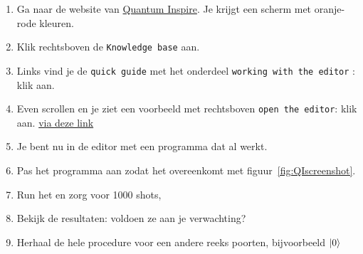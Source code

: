 \documentclass[../../main.tex]{subfiles}
\begin{document}
\begin{enumerate}
\item Ga naar de website van \href{https://www.quantum-inspire.com/}{Quantum Inspire}. Je krijgt een scherm met oranje-rode kleuren.
\item Klik rechtsboven de \texttt{Knowledge base} aan.
\item Links vind je de \texttt{quick guide} met het onderdeel \texttt{working with the editor} : klik aan.
\item Even scrollen en je ziet een voorbeeld met rechtsboven \texttt{open the editor}: klik aan. 
\href{https://www.quantum-inspire.com/projects/new?code=version\%201.0\%0Aqubits\%202\%0A\%0A\%7Bprep_z\%20q\%5B0\%5D\%20\%7C\%20prep_z\%20q\%5B1\%5D\%7D\%0A\%0A\%23\%20Create\%20a\%20superposition\%20state\%20for\%20qubit\%200\%0AH\%20q\%5B0\%5D\%0A\%0A\%23\%20Entangle\%20both\%20qubits\%20using\%20a\%20CNOT\%20gate\%0ACNOT\%20q\%5B0\%5D,\%20q\%5B1\%5D}{via deze  link}
\item Je bent nu in de editor met een programma dat al werkt.
\item Pas het programma aan zodat het overeenkomt met figuur~\ref{fig:QIscreenshot}.
\item Run het en zorg voor 1000 shots,
\item Bekijk de resultaten: voldoen ze aan je verwachting?
\item Herhaal de hele procedure voor een andere reeks poorten, bijvoorbeeld 
$\ket{0}$
\end{enumerate}
\end{document}
